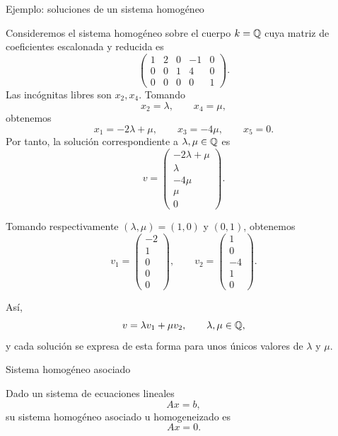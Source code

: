 \begin{frame}[allowframebreaks, t]{Ejemplo: soluciones de un sistema homogéneo}

Consideremos el sistema homogéneo sobre el cuerpo $k=\mathbb{Q}$ cuya matriz de coeficientes
escalonada y reducida es
\[
\begin{pmatrix}
1&2&0&-1&0\\
0&0&1&4&0\\
0&0&0&0&1
\end{pmatrix}.
\]
Las incógnitas libres son \(x_2,x_4\). Tomando
\[
x_2=\lambda,\qquad x_4=\mu,
\]
obtenemos
\[
x_1=-2\lambda+\mu,\qquad
x_3=-4\mu,\qquad
x_5=0.
\]
Por tanto, la solución correspondiente a \(\lambda,\mu\in \mathbb{Q}\) es
\[
v=
\begin{pmatrix}
-2\lambda+\mu\\
\lambda\\
-4\mu\\
\mu\\
0
\end{pmatrix}.
\]

Tomando respectivamente \((\lambda,\mu)=(1,0)\) y \((0,1)\),
obtenemos
\[
v_1=
\begin{pmatrix}-2\\1\\0\\0\\0\end{pmatrix},
\qquad
v_2=
\begin{pmatrix}1\\0\\-4\\1\\0\end{pmatrix}.
\]

Así,
\[
v=\lambda v_1+\mu v_2,
\qquad \lambda,\mu\in \mathbb{Q},
\]
y cada solución se expresa de esta forma para unos
\alert{únicos} valores de \(\lambda\) y \(\mu\).

\end{frame}

\begin{frame}{Sistema homogéneo asociado}

\begin{definition}
Dado un sistema de ecuaciones lineales
\[
Ax=b,
\]
su \alert{sistema homogéneo asociado} u \alert{homogeneizado} es
\[
Ax=0.
\]
\end{definition}

\end{frame}

